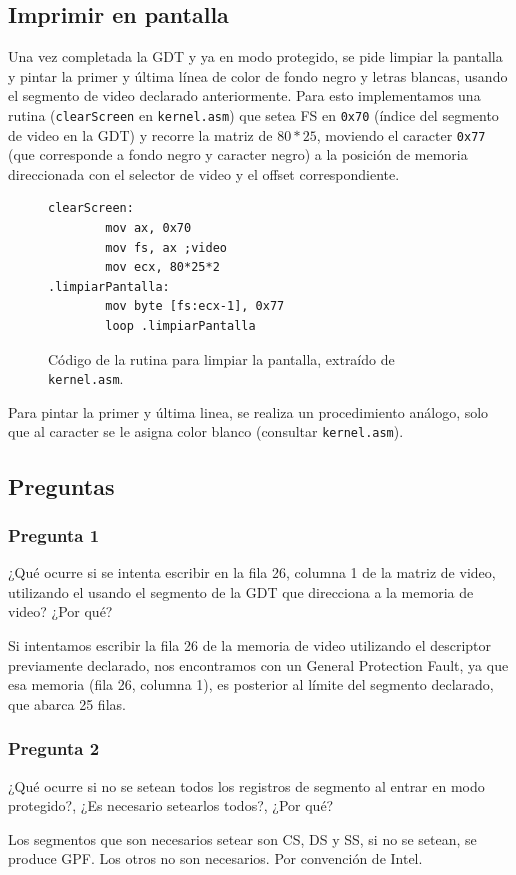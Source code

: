 \documentclass[10pt, a4paper]{article}
\begin{document}
\subsection{Imprimir en pantalla}
Una vez completada la GDT y ya en modo protegido, se pide limpiar la pantalla y pintar la primer y última línea de color de fondo negro y letras blancas, usando
el segmento de video declarado anteriormente.
Para esto implementamos una rutina (\texttt{clearScreen} en \texttt{kernel.asm}) que setea FS en \texttt{0x70} (índice del segmento de video en la GDT) y recorre
la matriz de $80*25$, moviendo el caracter \texttt{0x77} (que corresponde a fondo negro y caracter negro) a la posición de memoria direccionada con el selector de video 
y el offset correspondiente.

\begin{figure}[!h]
\begin{center}
\begin{verbatim}
clearScreen:		
		mov ax, 0x70
		mov fs, ax ;video
		mov ecx, 80*25*2
.limpiarPantalla:
		mov byte [fs:ecx-1], 0x77
		loop .limpiarPantalla
\end{verbatim}
\caption{Código de la rutina para limpiar la pantalla, extraído de \texttt{kernel.asm}.}
\end{center}
\end{figure}
Para pintar la primer y última linea, se realiza un procedimiento análogo, solo que al caracter se le asigna color blanco (consultar \texttt{kernel.asm}). 
		
\subsection{Preguntas}
\subsubsection*{Pregunta 1}
 \begin{framed}
¿Qué ocurre si se intenta escribir en la fila 26, columna 1 de la matriz de video, utilizando el usando el segmento de la GDT que direcciona a la memoria de video?
¿Por qué?
\end{framed}
Si intentamos escribir la fila 26 de la memoria de video utilizando el descriptor previamente declarado, nos encontramos con un General Protection Fault, ya que esa memoria (fila 26, columna 1), es posterior al lí­mite del segmento declarado, que abarca 25 filas.
\subsubsection*{Pregunta 2}
 \begin{framed}
¿Qué ocurre si no se setean todos los registros de segmento al entrar en modo protegido?, ¿Es necesario setearlos todos?, ¿Por qué?
\end{framed}
Los segmentos que son necesarios setear son CS, DS y SS, si no se setean, se produce GPF. Los otros no son necesarios. Por convención de Intel. %
\end{document}

